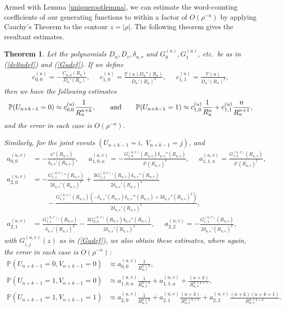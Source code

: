 \documentclass[proceedings]{aofa}
\newtheorem{theorem}{Theorem}
\newcommand{\pro}{\mathbb{P}}
\newcommand{\Pu}{\pro(u)}
\newcommand{\deltauv}{\delta_{u,v}}
\newcommand{\duv}{\delta_{u,v}}
\newcommand{\Ru}{R_{u}}
\newcommand{\Ruv}{R_{u,v}}
\begin{document}
Armed with Lemma \ref{uniquerootlemma}, we can estimate the word-counting coefficients of our generating functions to within a factor of $O(\rho^{-n})$ by applying Cauchy's Theorem to the contour $z=|\rho|$. The following theorem gives the resultant estimates.
\begin{theorem}\label{restheorem}
Let the polynomials $D_{u},D_{v},\deltauv$ and $G_{0}^{(u)},
G_{1}^{(u)}$, etc.\ be as in (\ref{deltadef}) and
(\ref{Gudef}).
If we define
\begin{align*}
c_{0,0}^{(u)}=-\frac{C_{u,u}(\Ru)}{D_{u}'(\Ru)},\;\;\;\;\;c_{1,0}^{(u)}=\frac{\Pu D_{u}''(\Ru)}{D_{u}'(\Ru)^{3}},\;\;\;\;\; c_{1,1}^{(u)}=\frac{\Pu}{D_{u}'(\Ru)^{2}},
\end{align*}
then we have the following estimates
\begin{equation*} 
\pro(U_{n+k-1}=0)\approx c_{0,0}^{(u)}\frac{1}{\Ru^{n+k}},\qquad\hbox{and}\qquad
\pro(U_{n+k-1}=1)\approx c_{1,0}^{(u)}\frac{1}{\Ru^{n}}+c_{1,1}^{(u)}\frac{n}{\Ru^{n+1}},
\end{equation*}
and the error in each case is $O(\rho^{-n})$.

Similarly, for the joint events $(U_{n+k-1}=i,\;V_{n+k-1}=j)$,
and \begin{align*}
a_{0,0}^{(u,v)}&=-\frac{\psi'(\Ruv)}{\duv'(\Ruv)},\;\;\;\;\;a_{1,0,u}^{(u,v)}=-\frac{G_{1,0}^{(u,v)}(\Ruv) \duv''(\Ruv)}{\delta'(\Ruv)^{3}},\;\;\;\;\;a_{1,1,u}^{(u,v)}=\frac{G_{1,0}^{(u,v)}(\Ruv)}{\delta'(\Ruv)^{2}},\\
a_{2,0}^{(u,v)}&=-\frac{G_{1,1}^{(u,v)}{}''(\Ruv)}{2\duv'(\Ruv)^{3}}+\frac{3G_{1,1}^{(u,v)}{}'(\Ruv)\duv{}''(\Ruv)}{2\delta_{u,v}'(\Ruv)^{4}}\\
&\qquad{}-\frac{G_{1,1}^{(u,v)}(\Ruv)(-\delta_{u,v}'(\Ruv)\delta_{u,v}'''(\Ruv)+3\delta_{u,v}''(\Ruv)^{2})}{2\delta_{u,v}'(\Ruv)^{5}},\\
a_{2,1}^{(u,v)}&=\frac{G_{1,1}^{(u,v)}{}'(\Ruv)}{\delta_{u,v}{}'(\Ruv)^{3}}-\frac{3G_{0,0}^{(u,v)}(\Ruv)\delta_{u,v}{}''(\Ruv)}{2\delta_{u,v}{}'(\Ruv)^{4}},\;\;\;\;\; a_{2,2}^{(u,v)}=-\frac{G_{1,1}^{(u,v)}(\Ruv)}{2\delta_{u,v}'(\Ruv)^{3}},
\end{align*}
with $G_{i,j}^{(u,v)}(z)$ as in (\ref{Gudef}), we also obtain these
estimates, where again, the error in each case is $O(\rho^{-n})$:
\begin{align*}
\pro(U_{n+k-1}=0,V_{n+k-1}=0)&\approx a_{0,0}^{(u,v)}\frac{1}{\Ruv^{n+k}},\\
\pro(U_{n+k-1}=1,V_{n+k-1}=0)&\approx a_{1,0,u}^{(u,v)}\frac{1}{\Ruv^{n+k}}+a_{1,1,u}^{(u,v)}+\frac{(n+k)}{\Ruv^{n+k+1}},\\
\pro(U_{n+k-1}=1,V_{n+k-1}=1)&\approx a_{2,0}^{(u,v)}\frac{1}{\Ruv^{n+k}}+a_{2,1}^{(u,v)}\frac{(n+k)}{\Ruv^{n+k+1}}+a_{2,2}^{(u,v)}\frac{(n+k)(n+k+1)}{\Ruv^{n+k+2}}.
\end{align*}
\end{theorem}
\end{document}
